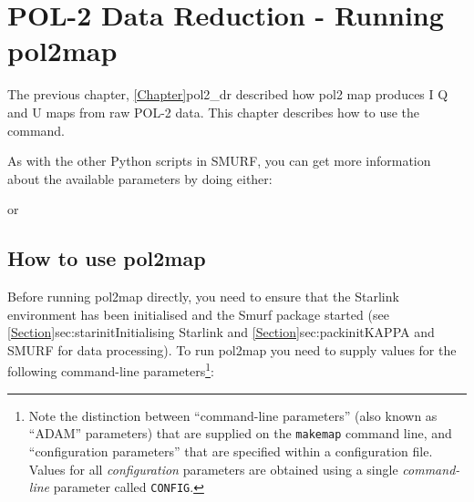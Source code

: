 \chapter{POL-2 Data Reduction - Running pol2map}
\label{sec:rundr}

The previous chapter, \cref{Chapter}{pol2_dr} described how pol2 map produces I Q and U maps from raw POL-2 data. 
This chapter describes how to use the command. 

As with the other Python scripts in SMURF, you can get more information about the available
parameters by doing either:
\begin{terminalv}
\end{terminalv}
or
\begin{terminalv}
\end{terminalv}

\section{How to use pol2map}

Before running pol2map directly, you need to ensure that the Starlink environment has been 
initialised and the Smurf package started (see
\cref{Section}{sec:starinit}{Initialising Starlink} and
\cref{Section}{sec:packinit}{KAPPA and SMURF for data processing}).
To run pol2map you need to supply values for the 
following command-line parameters\footnote{Note the distinction between
``command-line parameters'' (also known as ``ADAM'' parameters) that are
supplied on the \texttt{makemap} command line, and ``configuration parameters''
that are specified within a configuration file. Values for all
\emph{configuration} parameters are obtained using a single \emph{command-line}
parameter called \texttt{CONFIG}.}:



